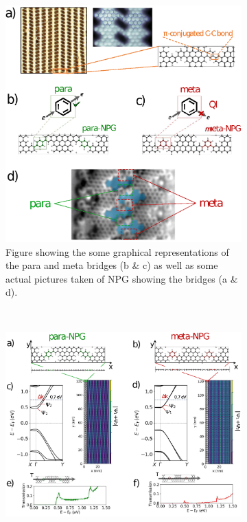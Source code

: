 \begin{figure}
	\centering
	\begin{subfigure}[b]{0.48\textwidth}
		\centering
		\includegraphics[width=\textwidth]{Figures/Fig_1.eps}
		\caption{Figure showing the some graphical representations of the para and meta bridges (b \& c) as well as some actual pictures taken of NPG showing the bridges (a \& d).}
		\label{studyfig1}
	\end{subfigure}
	~
	\begin{subfigure}[b]{0.48\textwidth}
		\centering
		\includegraphics[width=\textwidth]{Figures/Fig_2.eps}

\end{subfigure}
\end{figure}
